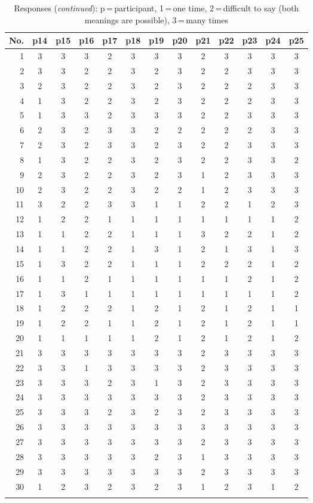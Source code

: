 \documentclass[output=paper]{langscibook}
\begin{document}
\begin{table}[p]\small
\begin{tabular}{r cccccccccccc}
\lsptoprule
No. &p14&p15&p16&p17&p18&p19&p20&p21&p22&p23&p24&p25\\\midrule
1   &3  &3  &3  &2  &3  &3  &3  &2  &3  &3  &3  &3\\
2   &3  &3  &2  &2  &3  &2  &3  &2  &2  &3  &3  &3\\
3   &2  &3  &2  &2  &3  &2  &3  &2  &2  &2  &3  &3\\
4   &1  &3  &2  &2  &3  &2  &3  &2  &2  &2  &3  &3\\
5   &1  &3  &3  &2  &3  &3  &3  &2  &2  &3  &3  &3\\
6   &2  &3  &2  &3  &3  &2  &2  &2  &2  &2  &3  &3\\
7   &2  &3  &2  &3  &3  &2  &3  &2  &2  &3  &3  &3\\
8   &1  &3  &2  &2  &3  &2  &3  &2  &2  &3  &3  &2\\
9   &2  &3  &2  &2  &3  &2  &3  &1  &2  &3  &3  &3\\
10  &2  &3  &2  &2  &3  &2  &2  &1  &2  &3  &3  &3\\
11  &3  &2  &2  &3  &3  &1  &1  &2  &2  &1  &2  &3\\
12  &1  &2  &2  &1  &1  &1  &1  &1  &1  &1  &1  &2\\
13  &1  &1  &2  &2  &1  &1  &1  &3  &2  &2  &1  &2\\
14  &1  &1  &2  &2  &1  &3  &1  &2  &1  &3  &1  &3\\
15  &1  &3  &2  &2  &1  &1  &1  &2  &2  &2  &1  &2\\
16  &1  &1  &2  &1  &1  &1  &1  &1  &1  &2  &1  &2\\
17  &1  &3  &1  &1  &1  &1  &1  &1  &1  &1  &1  &2\\
18  &1  &2  &2  &2  &1  &2  &1  &2  &1  &2  &1  &1\\
19  &1  &2  &2  &1  &1  &2  &1  &2  &1  &2  &1  &1\\
20  &1  &1  &1  &1  &1  &2  &1  &2  &1  &2  &1  &2\\
21  &3  &3  &3  &3  &3  &3  &3  &2  &3  &3  &3  &3\\
22  &3  &3  &1  &3  &3  &3  &3  &2  &3  &3  &3  &3\\
23  &3  &3  &3  &2  &3  &1  &3  &2  &3  &3  &3  &3\\
24  &3  &3  &3  &3  &3  &3  &3  &2  &3  &3  &3  &3\\
25  &3  &3  &3  &2  &3  &2  &3  &2  &3  &3  &3  &3\\
26  &3  &3  &3  &3  &3  &3  &3  &3  &3  &3  &3  &3\\
27  &3  &3  &3  &3  &3  &3  &3  &2  &3  &3  &3  &3\\
28  &3  &3  &3  &3  &3  &2  &3  &1  &3  &3  &3  &3\\
29  &3  &3  &3  &3  &3  &3  &3  &2  &3  &3  &3  &3\\
30  &1  &2  &3  &2  &3  &2  &3  &1  &2  &3  &1  &2\\
\lspbottomrule
\end{tabular}
\caption{Responses (\emph{continued}): p\,=\,participant, 1\,=\,one time, 2\,=\,difficult to say (both meanings are possible), 3\,=\,many times}
\end{table}

\clearpage
{\sloppy\printbibliography[heading=subbibliography,notkeyword=this]}
\end{document}
